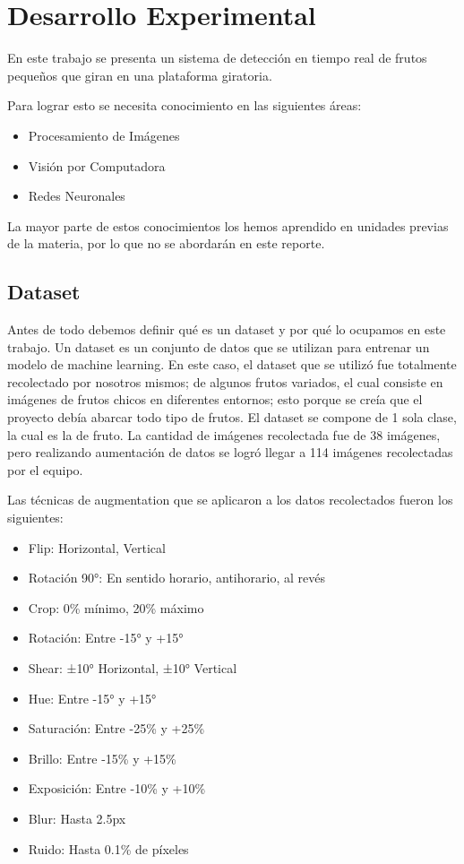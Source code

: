 \documentclass[conference]{IEEEtran}
\begin{document}
\section{Desarrollo Experimental}
En este trabajo se presenta un sistema de detección en tiempo real de frutos pequeños que giran en una plataforma giratoria.

Para lograr esto se necesita conocimiento en las siguientes áreas:
\begin{itemize}
    \item Procesamiento de Imágenes
    \item Visión por Computadora
    \item Redes Neuronales
\end{itemize}

La mayor parte de estos conocimientos los hemos aprendido en unidades previas de la materia, por lo que no se abordarán en este reporte.

\subsection{Dataset}
Antes de todo debemos definir qué es un dataset y por qué lo ocupamos en este trabajo.
Un dataset es un conjunto de datos que se utilizan para entrenar un modelo de machine learning. En este caso, el dataset que se utilizó fue totalmente recolectado por nosotros mismos; de algunos frutos variados,\cite{roboflowLittleFruit} el cual consiste en imágenes de frutos chicos en diferentes entornos; esto porque se creía que el proyecto debía abarcar todo tipo de frutos. El dataset se compone de 1 sola clase, la cual es la de fruto. La cantidad de imágenes recolectada fue de 38 imágenes, pero realizando aumentación de datos se logró llegar a 114 imágenes recolectadas por el equipo.

Las técnicas de augmentation que se aplicaron a los datos recolectados fueron los siguientes:
\begin{itemize}
    \item Flip: Horizontal, Vertical
    \item Rotación 90°: En sentido horario, antihorario, al revés
    \item Crop: 0\% mínimo, 20\% máximo
    \item Rotación: Entre -15° y +15°
    \item Shear: ±10° Horizontal, ±10° Vertical
    \item Hue: Entre -15° y +15°
    \item Saturación: Entre -25\% y +25\%
    \item Brillo: Entre -15\% y +15\%
    \item Exposición: Entre -10\% y +10\%
    \item Blur: Hasta 2.5px
    \item Ruido: Hasta 0.1\% de píxeles
\end{itemize}
\end{document}
